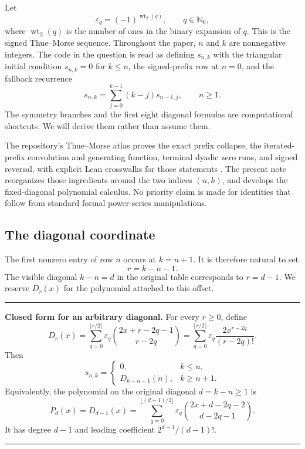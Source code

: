 \documentclass[11pt,oneside]{article}
\numberwithin{equation}{section}
\theoremstyle{definition}
\theoremstyle{remark}
\newcommand{\Nzero}{\mathbb N_0}
\newcommand{\eps}{\varepsilon}
\newcommand{\wt}{\operatorname{wt}_2}
\newcommand{\rising}[2]{#1^{\overline{#2}}}
\newcommand{\Diag}{D}
\newenvironment{boxedsummary}{%
  \par\medskip\noindent\begin{center}\begin{minipage}{0.94\textwidth}%
  \hrule\vspace{0.7em}\small
}{%
  \vspace{0.7em}\hrule\end{minipage}\end{center}\medskip
}
\begin{document}
Let
\begin{equation}
  \eps_q=(-1)^{\wt(q)},\qquad q\in\Nzero,
  \label{eq:tm-sign}
\end{equation}
where \(\wt(q)\) is the number of ones in the binary expansion of \(q\).
This is the signed Thue--Morse sequence.  Throughout the paper, \(n\) and
\(k\) are nonnegative integers.  The code in the question is read as defining
\(s_{n,k}\) with the triangular initial condition \(s_{n,k}=0\) for
\(k\le n\), the signed-prefix row at \(n=0\), and the fallback recurrence
\begin{equation}
  s_{n,k}=\sum_{j=0}^{k-1}(k-j)s_{n-1,j},\qquad n\ge1.
  \label{eq:weighted-recurrence}
\end{equation}
The symmetry branches and the first eight diagonal formulas are computational
shortcuts.  We will derive them rather than assume them.

The repository's Thue--Morse atlas proves the exact prefix collapse, the
iterated-prefix convolution and generating function, terminal dyadic zero
runs, and signed reversal, with explicit Lean crosswalks for those statements
\cite{ReshetnikovAtlas}.  The present note reorganizes those ingredients around
the two indices \((n,k)\), and develops the fixed-diagonal polynomial calculus.
No priority claim is made for identities that follow from standard formal
power-series manipulations.

\subsection{The diagonal coordinate}

The first nonzero entry of row \(n\) occurs at \(k=n+1\).  It is therefore
natural to set
\begin{equation}
  r=k-n-1.
  \label{eq:r-coordinate}
\end{equation}
The visible diagonal \(k-n=d\) in the original table corresponds to
\(r=d-1\).  We reserve \(\Diag_r(x)\) for the polynomial attached to this
offset.

\begin{boxedsummary}
\textbf{Closed form for an arbitrary diagonal.}
For every \(r\ge0\), define
\begin{equation}
 \boxed{
 \Diag_r(x)=
 \sum_{q=0}^{\lfloor r/2\rfloor}
 \eps_q\binom{2x+r-2q-1}{r-2q}
 =\sum_{q=0}^{\lfloor r/2\rfloor}
 \eps_q\frac{\rising{2x}{r-2q}}{(r-2q)!}.}
 \label{eq:main-diagonal}
\end{equation}
Then
\begin{equation}
 \boxed{
 s_{n,k}=\begin{cases}
 0,&k\le n,\\[2mm]
 \Diag_{k-n-1}(n),&k\ge n+1.
 \end{cases}}
 \label{eq:main-table-answer}
\end{equation}
Equivalently, the polynomial on the original diagonal \(d=k-n\ge1\) is
\begin{equation}
 \boxed{
 P_d(x)=\Diag_{d-1}(x)=
 \sum_{q=0}^{\lfloor(d-1)/2\rfloor}
 \eps_q\binom{2x+d-2q-2}{d-2q-1}.}
 \label{eq:main-d-answer}
\end{equation}
It has degree \(d-1\) and leading coefficient \(2^{d-1}/(d-1)!\).
\end{boxedsummary}
\end{document}
